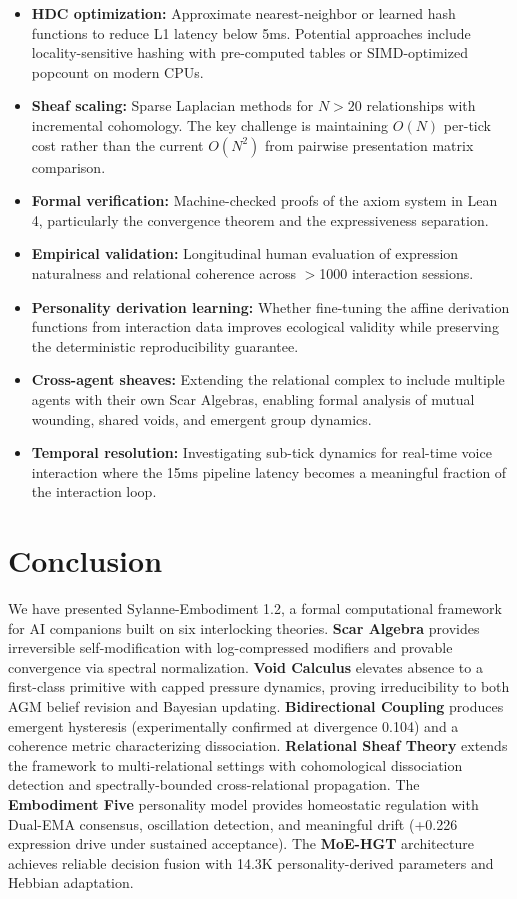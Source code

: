\documentclass[11pt]{article}
\begin{document}
\begin{itemize}
\item \textbf{HDC optimization:} Approximate nearest-neighbor or learned hash functions to reduce L1 latency below 5ms. Potential approaches include locality-sensitive hashing with pre-computed tables or SIMD-optimized popcount on modern CPUs.
\item \textbf{Sheaf scaling:} Sparse Laplacian methods for $N > 20$ relationships with incremental cohomology. The key challenge is maintaining $O(N)$ per-tick cost rather than the current $O(N^2)$ from pairwise presentation matrix comparison.
\item \textbf{Formal verification:} Machine-checked proofs of the axiom system in Lean 4, particularly the convergence theorem and the expressiveness separation.
\item \textbf{Empirical validation:} Longitudinal human evaluation of expression naturalness and relational coherence across $>$1000 interaction sessions.
\item \textbf{Personality derivation learning:} Whether fine-tuning the affine derivation functions from interaction data improves ecological validity while preserving the deterministic reproducibility guarantee.
\item \textbf{Cross-agent sheaves:} Extending the relational complex to include multiple agents with their own Scar Algebras, enabling formal analysis of mutual wounding, shared voids, and emergent group dynamics.
\item \textbf{Temporal resolution:} Investigating sub-tick dynamics for real-time voice interaction where the 15ms pipeline latency becomes a meaningful fraction of the interaction loop.
\end{itemize}

\section{Conclusion}
\label{sec:conclusion}

We have presented Sylanne-Embodiment 1.2, a formal computational framework for AI companions built on six interlocking theories. \textbf{Scar Algebra} provides irreversible self-modification with log-compressed modifiers and provable convergence via spectral normalization. \textbf{Void Calculus} elevates absence to a first-class primitive with capped pressure dynamics, proving irreducibility to both AGM belief revision and Bayesian updating. \textbf{Bidirectional Coupling} produces emergent hysteresis (experimentally confirmed at divergence 0.104) and a coherence metric characterizing dissociation. \textbf{Relational Sheaf Theory} extends the framework to multi-relational settings with cohomological dissociation detection and spectrally-bounded cross-relational propagation. The \textbf{Embodiment Five} personality model provides homeostatic regulation with Dual-EMA consensus, oscillation detection, and meaningful drift (+0.226 expression drive under sustained acceptance). The \textbf{MoE-HGT} architecture achieves reliable decision fusion with 14.3K personality-derived parameters and Hebbian adaptation.
\end{document}
